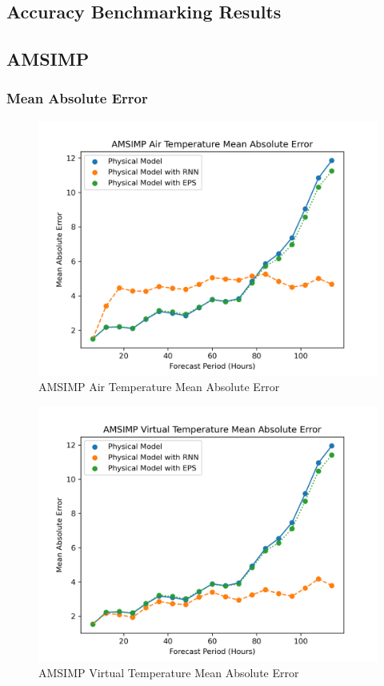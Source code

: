 \begin{appendices}
    \section{Accuracy Benchmarking Results}
    \subsection{AMSIMP}
    \subsubsection{Mean Absolute Error}
    \begin{figure}[H]
        \centering
        \includegraphics[width=.7\linewidth]{Graphs/accuracy/appendices/amsimp/temperature/mean_absolute_error.png}
        \caption{AMSIMP Air Temperature Mean Absolute Error}
    \end{figure}
    
    \begin{figure}[H]
        \centering
        \includegraphics[width=.7\linewidth]{Graphs/accuracy/appendices/amsimp/virtual_temperature/mean_absolute_error.png}
        \caption{AMSIMP Virtual Temperature Mean Absolute Error}
    \end{figure}
    

\end{appendices}
